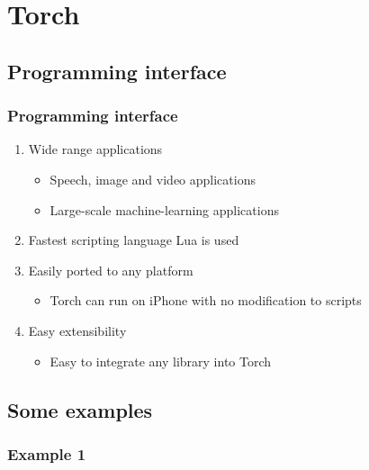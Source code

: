 
\section{Torch}\label{sec:Torch}

\subsection{Programming interface}

\begin{frame}
  \MyLogo
  \frametitle{Programming interface}  
\begin{enumerate}
\item Wide range applications
\begin{itemize}
\item Speech, image and video applications
\item  Large-scale machine-learning applications
\end{itemize}
\item Fastest scripting language Lua is used
\item Easily ported to any platform
\begin{itemize}
\item Torch can run on iPhone with no modification to scripts
\end{itemize}
\item Easy extensibility
\begin{itemize}
\item Easy to integrate any library into Torch
\end{itemize}
\end{enumerate}



\end{frame}

\subsection{Some examples}

\begin{frame}
  \MyLogo
  \frametitle{Example 1}  

\end{frame}